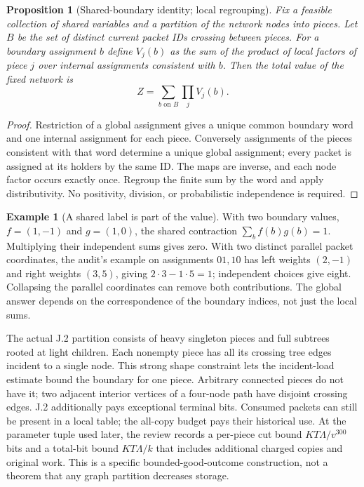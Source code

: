 \documentclass[11pt,letterpaper]{article}
\newtheorem{proposition}[theorem]{Proposition}
\theoremstyle{definition}\newtheorem{definition}[theorem]{Definition}\newtheorem{example}[theorem]{Example}
\theoremstyle{remark}\newtheorem{remark}[theorem]{Remark}
\begin{document}
\begin{proposition}[Shared-boundary identity; local regrouping]\label{prop:glue}
Fix a feasible collection of shared variables and a partition of the network nodes into pieces. Let $B$ be the set of distinct current packet IDs crossing between pieces. For a boundary assignment $b$ define $V_j(b)$ as the sum of the product of local factors of piece $j$ over internal assignments consistent with $b$. Then the total value of the fixed network is
\begin{equation}\label{eq:glue}
 Z=\sum_{b\text{ on }B}\prod_j V_j(b).
\end{equation}
\end{proposition}
\begin{proof}
Restriction of a global assignment gives a unique common boundary word and one internal assignment for each piece. Conversely assignments of the pieces consistent with that word determine a unique global assignment; every packet is assigned at its holders by the same ID. The maps are inverse, and each node factor occurs exactly once. Regroup the finite sum by the word and apply distributivity. No positivity, division, or probabilistic independence is required.
\end{proof}
\begin{example}[A shared label is part of the value]
With two boundary values, $f=(1,-1)$ and $g=(1,0)$, the shared contraction $\sum_b f(b)g(b)=1$. Multiplying their independent sums gives zero. With two distinct parallel packet coordinates, the audit's example on assignments $01,10$ has left weights $(2,-1)$ and right weights $(3,5)$, giving $2\cdot3-1\cdot5=1$; independent choices give eight. Collapsing the parallel coordinates can remove both contributions. The global answer depends on the correspondence of the boundary indices, not just the local sums.
\end{example}
The actual J.2 partition consists of heavy singleton pieces and full subtrees rooted at light children. Each nonempty piece has all its crossing tree edges incident to a single node. This strong shape constraint lets the incident-load estimate bound the boundary for one piece. Arbitrary connected pieces do not have it; two adjacent interior vertices of a four-node path have disjoint crossing edges. J.2 additionally pays exceptional terminal bits. Consumed packets can still be present in a local table; the all-copy budget pays their historical use. At the parameter tuple used later, the review records a per-piece cut bound $KT\Lambda/v^{300}$ bits and a total-bit bound $KT\Lambda/k$ that includes additional charged copies and original work. This is a specific bounded-good-outcome construction, not a theorem that any graph partition decreases storage.
\end{document}
